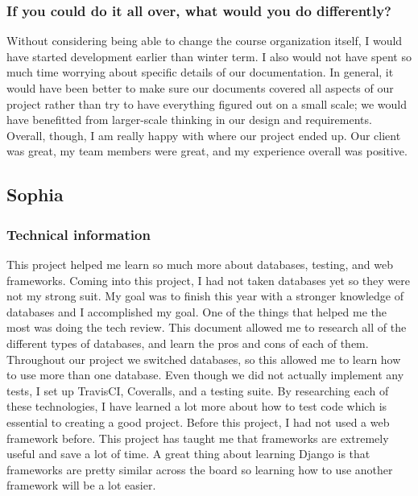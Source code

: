 \documentclass[onecolumn, draftclsnofoot,10pt, compsoc]{IEEEtran}
\begin{document}
\begin{flushleft}
\subsubsection{If you could do it all over, what would you do differently?}
Without considering being able to change the course organization itself, I would have started development earlier than winter term. I also would not have spent so much time worrying about specific details of our documentation. In general, it would have been better to make sure our documents covered all aspects of our project rather than try to have everything figured out on a small scale; we would have benefitted from larger-scale thinking in our design and requirements.
Overall, though, I am really happy with where our project ended up. Our client was great, my team members were great, and my experience overall was positive.
 
\subsection{Sophia}
\subsubsection{Technical information}
This project helped me learn so much more about databases, testing, and web frameworks. Coming into this project, I had not taken databases yet so they were not my strong suit. My goal was to finish this year with a stronger knowledge of databases and I accomplished my goal. One of the things that helped me the most was doing the tech review. This document allowed me to research all of the different types of databases, and learn the pros and cons of each of them. Throughout our project we switched databases, so this allowed me to learn how to use more than one database.
Even though we did not actually implement any tests, I set up TravisCI, Coveralls, and a testing suite. By researching each of these technologies, I have learned a lot more about how to test code which is essential to creating a good project. 
Before this project, I had not used a web framework before. This project has taught me that frameworks are extremely useful and save a lot of time. A great thing about learning Django is that frameworks are pretty similar across the board so learning how to use another framework will be a lot easier.

\end{flushleft}
\end{document}
